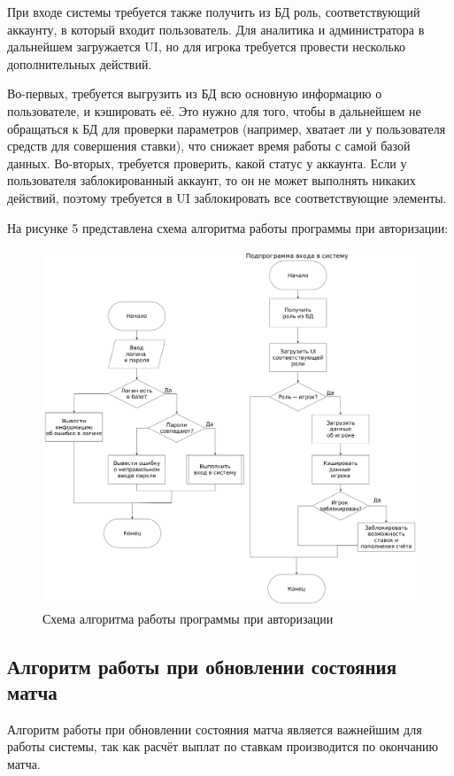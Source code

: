 При входе системы требуется также получить из БД роль, соответствующий аккаунту, в который входит пользователь.
Для аналитика и администратора в дальнейшем загружается UI, но для игрока требуется провести несколько дополнительных действий.

Во-первых, требуется выгрузить из БД всю основную информацию о пользователе, и кэшировать её.
Это нужно для того, чтобы в дальнейшем не обращаться к БД для проверки параметров (например, хватает ли у пользователя средств для совершения ставки), что снижает время работы с самой базой данных.
Во-вторых, требуется проверить, какой статус у аккаунта. 
Если у пользователя заблокированный аккаунт, то он не может выполнять никаких действий, поэтому требуется в UI заблокировать все соответствующие элементы.

\newpage
На рисунке 5 представлена схема алгоритма работы программы при авторизации:
\FloatBarrier
\begin{figure}[h]	
	\begin{center}
		\includegraphics[width=\linewidth]{inc/auth.png}
	\end{center}
	\caption{Схема алгоритма работы программы при авторизации}
	\label{fig::auth}
\end{figure}
\FloatBarrier

\newpage
\subsection{Алгоритм работы при обновлении состояния матча}
Алгоритм работы при обновлении состояния матча является важнейшим для работы системы, так как расчёт выплат по ставкам производится по окончанию матча.

